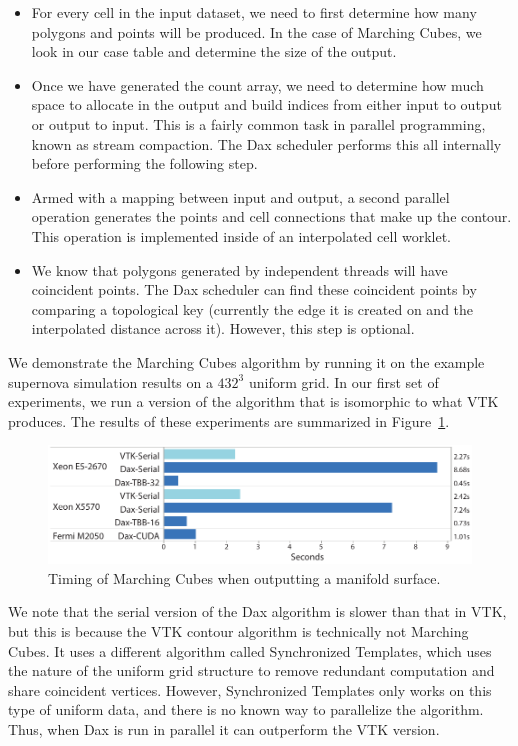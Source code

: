 \begin{itemize}
\item For every cell in the input dataset, we need to first determine how
  many polygons and points will be produced. In the case of Marching Cubes,
  we look in our case table and determine the size of the output.
\item Once we have generated the count array, we need to determine how much
  space to allocate in the output and build indices from either input to
  output or output to input. This is a fairly common task in parallel
  programming, known as stream compaction. The Dax scheduler performs this
  all internally before performing the following step.
\item Armed with a mapping between input and output, a second parallel
  operation generates the points and cell connections that make up the
  contour. This operation is implemented inside of an interpolated cell
  worklet.
\item We know that polygons generated by independent threads will have
  coincident points. The Dax scheduler can find these coincident points by
  comparing a topological key (currently the edge it is created on and the
  interpolated distance across it). However, this step is optional.
\end{itemize}

We demonstrate the Marching Cubes algorithm by running it on the example
supernova simulation results on a $432^3$ uniform grid. In our first set of
experiments, we run a version of the algorithm that is isomorphic to what
VTK produces. The results of these experiments are summarized in
Figure~\ref{fig:TimingMCManifold}.

\begin{figure}[htb]
  \centering
  \includegraphics{images/TimingMCManifold}
  \caption{Timing of Marching Cubes when outputting a manifold surface.}
  \label{fig:TimingMCManifold}
\end{figure}

We note that the serial version of the Dax algorithm is slower than that in
VTK, but this is because the VTK contour algorithm is technically not
Marching Cubes. It uses a different algorithm called Synchronized
Templates, which uses the nature of the uniform grid structure to remove
redundant computation and share coincident vertices. However, Synchronized
Templates only works on this type of uniform data, and there is no known
way to parallelize the algorithm. Thus, when Dax is run in parallel it can
outperform the VTK version.

